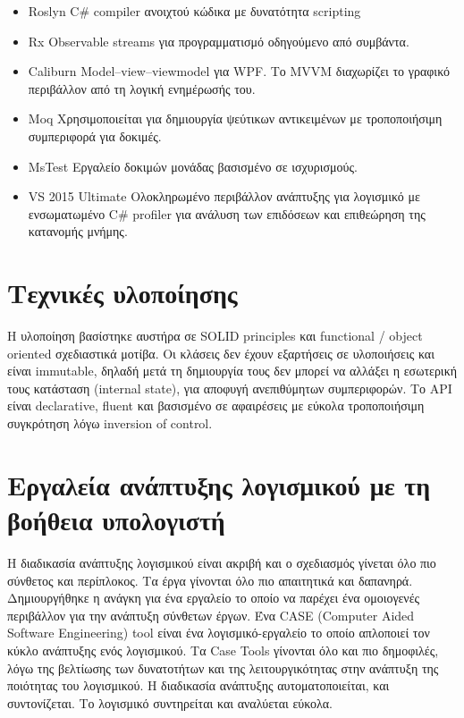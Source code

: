\begin{itemize}
	\item{Roslyn} C\# compiler ανοιχτού κώδικα με δυνατότητα scripting
	\item{Rx} Observable streams για προγραμματισμό οδηγούμενο από συμβάντα.
	\item{Caliburn} Model–view–viewmodel για WPF. Το MVVM διαχωρίζει το γραφικό περιβάλλον από τη λογική ενημέρωσής του.
	\item{Moq} Χρησιμοποιείται για δημιουργία ψεύτικων αντικειμένων με τροποποιήσιμη συμπεριφορά για δοκιμές.
	\item{MsTest} Εργαλείο δοκιμών μονάδας βασισμένο σε ισχυρισμούς.
	\item{VS 2015 Ultimate} Ολοκληρωμένο περιβάλλον ανάπτυξης για λογισμικό με ενσωματωμένο C\# profiler για ανάλυση των επιδόσεων και επιθεώρηση της κατανομής μνήμης.
\end{itemize}

\section{Τεχνικές υλοποίησης}
Η υλοποίηση βασίστηκε αυστήρα σε SOLID principles και functional / object oriented σχεδιαστικά μοτίβα. Οι κλάσεις δεν έχουν εξαρτήσεις σε υλοποιήσεις και είναι immutable, δηλαδή μετά τη δημιουργία τους δεν μπορεί να αλλάξει η εσωτερική τους κατάσταση (internal state), για αποφυγή ανεπιθύμητων συμπεριφορών. Το API είναι declarative, fluent και βασισμένο σε αφαιρέσεις με εύκολα τροποποιήσιμη συγκρότηση λόγω inversion of control.

\section{Εργαλεία ανάπτυξης λογισμικού με τη βοήθεια υπολογιστή}
Η διαδικασία ανάπτυξης λογισμικού είναι ακριβή και ο σχεδιασμός γίνεται όλο πιο σύνθετος και περίπλοκος. Τα έργα γίνονται όλο πιο απαιτητικά και δαπανηρά. Δημιουργήθηκε η ανάγκη για ένα εργαλείο το οποίο να παρέχει ένα ομοιογενές περιβάλλον για την ανάπτυξη σύνθετων έργων. 
Ένα CASE (Computer Aided Software Engineering) tool είναι ένα λογισμικό-εργαλείο το οποίο απλοποιεί τον κύκλο ανάπτυξης ενός λογισμικού. Τα Case Tools γίνονται όλο και πιο δημοφιλές, λόγω της βελτίωσης των δυνατοτήτων και της λειτουργικότητας στην ανάπτυξη της ποιότητας του λογισμικού. Η διαδικασία ανάπτυξης αυτοματοποιείται, και συντονίζεται. Το λογισμικό συντηρείται και αναλύεται εύκολα. 

